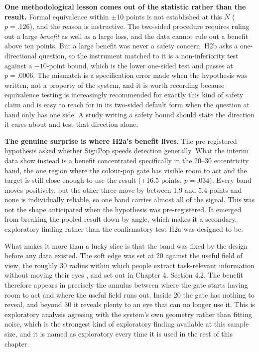 \textbf{One methodological lesson comes out of the statistic rather than the result.} Formal
equivalence within $\pm$10 points is not established at this $N$ ($p = .126$), and the reason is
instructive. The two-sided procedure requires ruling out a large \textit{benefit} as well as a large
loss, and the data cannot rule out a benefit above ten points. But a large benefit was never a safety
concern. H2b asks a one-directional question, so the instrument matched to it is a non-inferiority
test against a $-10$-point bound, which is the lower one-sided test and passes at $p = .0006$. The
mismatch is a specification error made when the hypothesis was written, not a property of the system,
and it is worth recording because equivalence testing is increasingly recommended for exactly this
kind of safety claim \citep{lakens2017} and is easy to reach for in its two-sided default form when
the question at hand only has one side. A study writing a safety bound should state the direction it
cares about and test that direction alone.

\textbf{The genuine surprise is where H2a's benefit lives.} The pre-registered hypothesis asked
whether SignPop speeds detection generally. What the interim data show instead is a benefit
concentrated specifically in the 20--30\textdegree{} eccentricity band, the one region where the
colour-pop gate has visible room to act and the target is still close enough to use the result
(+16.5 points, $p = .034$). Every band moves positively, but the other three move by between 1.9 and
5.4 points and none is individually reliable, so one band carries almost all of the signal. This was
not the shape anticipated when the hypothesis was pre-registered. It emerged from breaking the
pooled result down by angle, which makes it a secondary, exploratory finding rather than the
confirmatory test H2a was designed to be.

What makes it more than a lucky slice is that the band was fixed by the design before any data
existed. The soft edge was set at 20\textdegree{} against the useful field of view, the roughly
30\textdegree{} radius within which people extract task-relevant information without moving their
eyes \citep{ball1993}, and set out in Chapter 4, Section 4.2. The benefit therefore appears in precisely the
annulus between where the gate starts having room to act and where the useful field runs out. Inside
20\textdegree{} the gate has nothing to reveal, and beyond 30\textdegree{} it reveals plenty to an eye
that can no longer use it. This is exploratory analysis agreeing with the system's own geometry
rather than fitting noise, which is the strongest kind of exploratory finding available at this
sample size, and it is named as exploratory every time it is used in the rest of this chapter.

